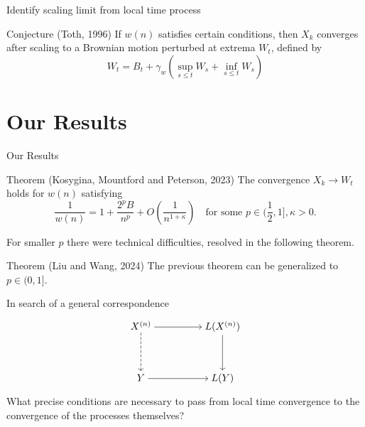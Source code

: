 \documentclass{if-beamer}
\begin{document}
\begin{frame}{Identify scaling limit from local time process}
    \begin{block}{Conjecture (Toth, 1996)}
        If $w(n)$ satisfies certain conditions, then $X_k$ converges after scaling to a Brownian motion perturbed at extrema $W_t$, defined by
        \begin{equation}
            W_t = B_t + \gamma_w (\sup_{s \leq t} W_s + \inf_{s \leq t} W_s)
        \end{equation}
    \end{block}


\end{frame}

\section{Our Results}

\begin{frame}{Our Results}
    \begin{block}{Theorem (Kosygina, Mountford and Peterson, 2023)}
        The convergence $X_k \to W_t$ holds for $w(n)$ satisfying
        \begin{equation*}
            \frac{1}{w(n)}=1+\frac{2^p B}{n^p}+O\left(\frac{1}{n^{1+\kappa}}\right) \quad \text{for some } p\in (\frac{1}{2}, 1], \kappa>0
        .\end{equation*}
    \end{block}
    \pause
    For smaller $p$ there were technical difficulties, resolved in the following theorem.
    \pause
    \begin{block}{Theorem (Liu and Wang, 2024)}
        The previous theorem can be generalized to $p \in (0,1]$.
    \end{block}
    \pause
    \begin{exampleblock}{In search of a general correspondence}
        \begin{minipage}{0.45\textwidth}
\[\begin{tikzcd}[ampersand replacement=\&,cramped]
	{X^{(n)}} \&\& {L(X^{(n)})} \\
	\\
	Y \&\& {L(Y)}
	\arrow[from=1-1, to=1-3]
	\arrow[from=1-3, to=3-3]
	\arrow[dashed, from=1-1, to=3-1]
	\arrow[from=3-1, to=3-3]
\end{tikzcd}\]
\end{minipage}
\begin{minipage}{0.45\textwidth}

What precise conditions are necessary to pass from local time convergence to the convergence of the processes themselves?
\end{minipage}
    \end{exampleblock}

        
\end{frame}
\end{document}
